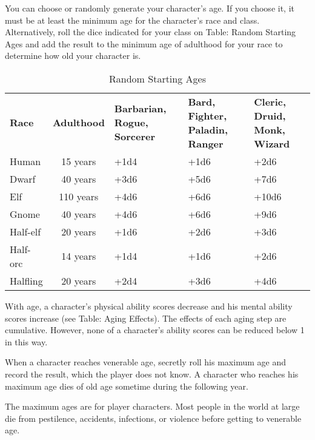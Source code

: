 				
You can choose or randomly generate your character's age. If you choose it, it must be at least the minimum age for the character's race and class. Alternatively, roll the dice indicated for your class on Table: Random Starting Ages and add the result to the minimum age of adulthood for your race to determine how old your character is.
				

\begin{table}[htb]
\sffamily
{}
\caption{Random Starting Ages}
\centering
\begin{tabular}{l c p{2.5cm} p{2.5cm} p{2.2cm}}
\textbf{Race}  &  \textbf{Adulthood}  &  \textbf{Barbarian, Rogue, Sorcerer}  &  \textbf{Bard, Fighter, Paladin, Ranger}  &  {\raggedright{}\textbf{Cleric, Druid, Monk, Wizard}}\\
Human & 15 years & +1d4 & +1d6 & +2d6\\
Dwarf & 40 years & +3d6 & +5d6 & +7d6\\
Elf & 110 years & +4d6 & +6d6 & +10d6\\
Gnome & 40 years & +4d6 & +6d6 & +9d6\\
Half-elf & 20 years & +1d6 & +2d6 & +3d6\\
Half-orc & 14 years & +1d4 & +1d6 & +2d6\\
Halfling & 20 years & +2d4 & +3d6 & +4d6\\
\end{tabular}
\end{table}

				
With age, a character's physical ability scores decrease and his mental ability scores increase (see Table: Aging Effects). The effects of each aging step are cumulative. However, none of a character's ability scores can be reduced below 1 in this way.
				
When a character reaches venerable age, secretly roll his maximum age and record the result, which the player does not know. A character who reaches his maximum age dies of old age sometime during the following year.
				
The maximum ages are for player characters. Most people in the world at large die from pestilence, accidents, infections, or violence before getting to venerable age.

